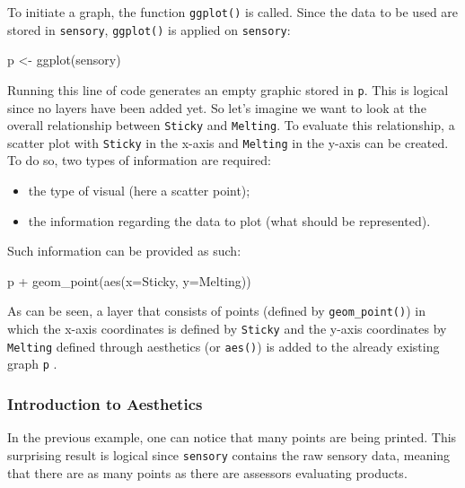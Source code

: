 \documentclass[
]{book}
\newenvironment{Shaded}{\begin{snugshade}}{\end{snugshade}}
\newcommand{\AttributeTok}[1]{\textcolor[rgb]{0.77,0.63,0.00}{#1}}
\newcommand{\FunctionTok}[1]{\textcolor[rgb]{0.00,0.00,0.00}{#1}}
\newcommand{\NormalTok}[1]{#1}
\newcommand{\OtherTok}[1]{\textcolor[rgb]{0.56,0.35,0.01}{#1}}
\newcommand{\SpecialCharTok}[1]{\textcolor[rgb]{0.00,0.00,0.00}{#1}}
\providecommand{\tightlist}{%
  \setlength{\itemsep}{0pt}\setlength{\parskip}{0pt}}
\begin{document}
To initiate a graph, the function \texttt{ggplot()} is called.
Since the data to be used are stored in \texttt{sensory}, \texttt{ggplot()} is applied on \texttt{sensory}:

\begin{Shaded}
\begin{Highlighting}[]
\NormalTok{p }\OtherTok{\textless{}{-}} \FunctionTok{ggplot}\NormalTok{(sensory)}
\end{Highlighting}
\end{Shaded}

Running this line of code generates an empty graphic stored in \texttt{p}. This is logical since no layers have been added yet.
So let's imagine we want to look at the overall relationship between \texttt{Sticky} and \texttt{Melting}. To evaluate this relationship, a scatter plot with \texttt{Sticky} in the x-axis and \texttt{Melting} in the y-axis can be created.
To do so, two types of information are required:

\begin{itemize}
\tightlist
\item
  the type of visual (here a scatter point);
\item
  the information regarding the data to plot (what should be represented).
\end{itemize}

Such information can be provided as such:

\begin{Shaded}
\begin{Highlighting}[]
\NormalTok{p }\SpecialCharTok{+} \FunctionTok{geom\_point}\NormalTok{(}\FunctionTok{aes}\NormalTok{(}\AttributeTok{x=}\NormalTok{Sticky, }\AttributeTok{y=}\NormalTok{Melting))}
\end{Highlighting}
\end{Shaded}

As can be seen, a layer that consists of points (defined by \texttt{geom\_point()}) in which the x-axis coordinates is defined by \texttt{Sticky} and the y-axis coordinates by \texttt{Melting} defined through aesthetics (or \texttt{aes()}) is added to the already existing graph \texttt{p} .

\hypertarget{introduction-to-aesthetics}{%
\subsubsection{Introduction to Aesthetics}\label{introduction-to-aesthetics}}

In the previous example, one can notice that many points are being printed. This surprising result is logical since \texttt{sensory} contains the raw sensory data, meaning that there are as many points as there are assessors evaluating products.
\end{document}
